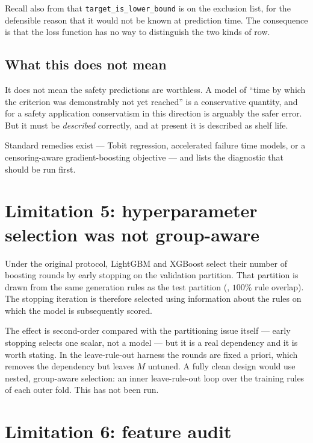 Recall also from  that \texttt{target\_is\_lower\_bound}
is on the exclusion list, for the defensible reason that it would not be
known at prediction time. The consequence is that the loss function has no
way to distinguish the two kinds of row.

\subsection{What this does not mean}

It does not mean the safety predictions are worthless. A model of
``time by which the criterion was demonstrably not yet reached'' is a
conservative quantity, and for a safety application conservatism in this
direction is arguably the safer error. But it must be \emph{described}
correctly, and at present it is described as shelf life.

Standard remedies exist --- Tobit regression, accelerated failure time
models, or a censoring-aware gradient-boosting objective --- and
 lists the diagnostic that should be run first.

\section{Limitation 5: hyperparameter selection was not group-aware}
\label{sec:hparam}

Under the original protocol, LightGBM and XGBoost select their number of
boosting rounds by early stopping on the validation partition. That
partition is drawn from the same generation rules as the test partition
(, $100\%$ rule overlap). The stopping iteration is
therefore selected using information about the rules on which the model is
subsequently scored.

The effect is second-order compared with the partitioning issue itself ---
early stopping selects one scalar, not a model --- but it is a real
dependency and it is worth stating. In the leave-rule-out harness the
rounds are fixed a priori, which removes the dependency but leaves $M$
untuned. A fully clean design would use nested, group-aware selection:
an inner leave-rule-out loop over the training rules of each outer fold.
This has not been run.

\section{Limitation 6: feature audit}
\label{sec:leakage}

